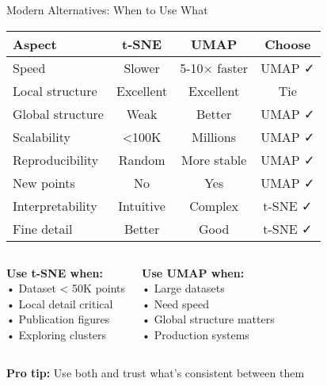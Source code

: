 \documentclass[aspectratio=169]{beamer}
\begin{document}
\begin{frame}{Modern Alternatives: When to Use What}
\begin{center}
\begin{tabular}{l|c|c|c}
\textbf{Aspect} & \textbf{t-SNE} & \textbf{UMAP} & \textbf{Choose} \\
\hline
Speed & Slower & 5-10× faster & UMAP ✓ \\
Local structure & Excellent & Excellent & Tie \\
Global structure & Weak & Better & UMAP ✓ \\
Scalability & <100K & Millions & UMAP ✓ \\
Reproducibility & Random & More stable & UMAP ✓ \\
New points & No & Yes & UMAP ✓ \\
Interpretability & Intuitive & Complex & t-SNE ✓ \\
Fine detail & Better & Good & t-SNE ✓ \\
\end{tabular}
\end{center}

\vspace{5mm}
\begin{columns}
\begin{center}
\colorbox{blue!20}{\parbox{0.9\textwidth}{\centering
\textbf{Use t-SNE when:}\\
\small
• Dataset < 50K points\\
• Local detail critical\\
• Publication figures\\
• Exploring clusters}}
\end{center}

\begin{center}
\colorbox{green!20}{\parbox{0.9\textwidth}{\centering
\textbf{Use UMAP when:}\\
\small
• Large datasets\\
• Need speed\\
• Global structure matters\\
• Production systems}}
\end{center}
\end{columns}

\vspace{3mm}
\begin{center}
\colorbox{yellow!20}{\parbox{0.85\textwidth}{\centering
\textbf{Pro tip:} Use both and trust what's consistent between them}}
\end{center}
\end{frame}
\end{document}
